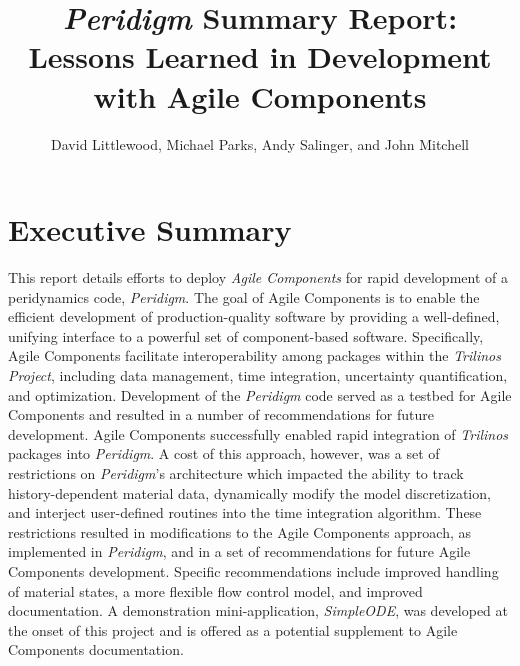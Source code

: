 \documentclass[10pt]{article}
\title{\emph{Peridigm} Summary Report:\\Lessons Learned in Development with Agile Components}
\author{David Littlewood,  Michael Parks, Andy Salinger, and John Mitchell}
\theoremstyle{plain}
\theoremstyle{definition}
\theoremstyle{remark}
\numberwithin{equation}{section}
\begin{document}
\maketitle



%
%
%
%
%
%


\section*{Executive Summary}
This report details efforts to deploy \emph{Agile Components} for rapid development of a peridynamics code, \emph{Peridigm}.  The goal of Agile Components is to enable the efficient development of production-quality software by providing a well-defined, unifying interface to a powerful set of component-based software.  Specifically, Agile Components facilitate interoperability among packages within the \emph{Trilinos Project}, including data management, time integration, uncertainty quantification, and optimization.  Development of the \emph{Peridigm} code served as a testbed for Agile Components and resulted in a number of recommendations for future development.  Agile Components successfully enabled rapid integration of \emph{Trilinos} packages into \emph{Peridigm}.  A cost of this approach, however, was a set of restrictions on \emph{Peridigm}'s architecture which impacted the ability to track history-dependent material data, dynamically modify the model discretization, and interject user-defined routines into the time integration algorithm.  These restrictions resulted in modifications to the Agile Components approach, as implemented in \emph{Peridigm}, and in a set of recommendations for future Agile Components development.  Specific recommendations include improved handling of material states, a more flexible flow control model, and improved documentation.  A demonstration mini-application, \emph{SimpleODE}, was developed at the onset of this project and is offered as a potential supplement to Agile Components documentation.
\end{document}

